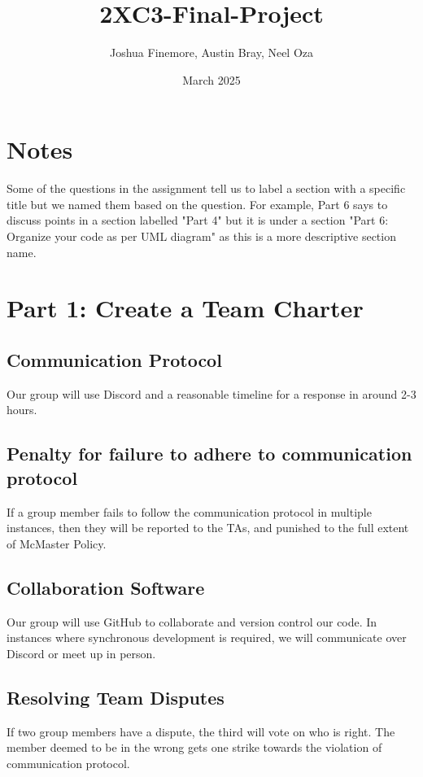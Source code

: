 \documentclass[12pt]{article}
\title{2XC3-Final-Project}
\author{Joshua Finemore, Austin Bray, Neel Oza}
\date{March 2025}
\begin{document}
\maketitle
\tableofcontents 

\section*{Notes}
Some of the questions in the assignment tell us to label a section with a specific title but we named them based on the question. For example, Part 6 says to discuss points in a section labelled "Part 4" but it is under a section "Part 6: Organize your code as per UML diagram" as this is a more descriptive section name.

\newpage
\section*{Part 1: Create a Team Charter}

\subsection*{Communication Protocol}
Our group will use Discord and a reasonable timeline for a response in around 2-3 hours.

\subsection*{Penalty for failure to adhere to communication protocol}
If a group member fails to follow the communication protocol in multiple instances, then they will be reported to the TAs, and punished to the full extent of McMaster Policy.

\subsection*{Collaboration Software}
Our group will use GitHub to collaborate and version control our code. In instances where synchronous development is required, we will communicate over Discord or meet up in person.

\subsection*{Resolving Team Disputes}
If two group members have a dispute, the third will vote on who is right. The member deemed to be in the wrong gets one strike towards the violation of communication protocol.
\end{document}
